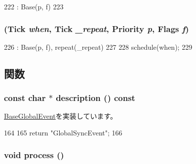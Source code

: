 \begin{DoxyCode}
222         : Base(p, f)
223     { }
\end{DoxyCode}
\hypertarget{classGlobalSyncEvent_a9c04aecb6b4ee404eb536a731e3cc64e}{
\subsubsection[{GlobalSyncEvent}]{ ({\bf Tick} {\em when}, \/  {\bf Tick} {\em \_\-repeat}, \/  {\bf Priority} {\em p}, \/  {\bf Flags} {\em f})}}
\label{classGlobalSyncEvent_a9c04aecb6b4ee404eb536a731e3cc64e}



\begin{DoxyCode}
226         : Base(p, f), repeat(_repeat)
227     {
228         schedule(when);
229     }
\end{DoxyCode}


\subsection{関数}
\hypertarget{classGlobalSyncEvent_a5a14fe478e2393ff51f02e9b7be27e00}{
\subsubsection[{description}]{\setlength{\rightskip}{0pt plus 5cm}const char $\ast$ description () const}}
\label{classGlobalSyncEvent_a5a14fe478e2393ff51f02e9b7be27e00}


\hyperlink{classBaseGlobalEvent_aaf0ee88413e805ebda5569f5c13d847f}{BaseGlobalEvent}を実装しています。


\begin{DoxyCode}
164 {
165     return "GlobalSyncEvent";
166 }
\end{DoxyCode}
\hypertarget{classGlobalSyncEvent_a2e9c5136d19b1a95fc427e0852deab5c}{
\subsubsection[{process}]{\setlength{\rightskip}{0pt plus 5cm}void process ()}}
\label{classGlobalSyncEvent_a2e9c5136d19b1a95fc427e0852deab5c}



